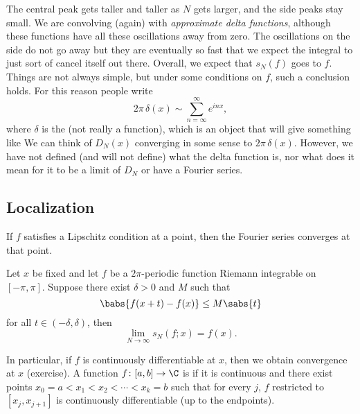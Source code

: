 The central peak gets taller and taller as $N$ gets larger,
and the side peaks stay small.
We are convolving (again) with
\emph{approximate delta functions},
although these functions have
all these oscillations away from zero.  The oscillations on the side do not go away
but they are eventually so fast that we expect the integral to just sort of
cancel itself out there.
Overall, we expect that
$s_N(f)$ goes to $f$.  Things are not always simple,
but under some conditions on $f$, such a conclusion holds.  For this reason
people write
\begin{equation*}
2\pi \, \delta(x) \sim \sum_{n=\infty}^\infty e^{inx} ,
\end{equation*}
where $\delta$ is the  (not really a function),
which is an object that will give something like
We can think of $D_N(x)$ converging in some sense to $2 \pi\, \delta(x)$.
However, we have not defined (and will not define) what the delta function
is, nor what does it mean for it to be a limit of $D_N$ or have a Fourier series.

\subsection{Localization}

If $f$ satisfies a Lipschitz condition at a point, then
the Fourier series converges at that point.

\begin{thm} \label{thm:fourierlocalization}
Let $x$ be fixed and let $f$ be a $2\pi$-periodic function
Riemann integrable on $[-\pi,\pi]$.  Suppose
there exist $\delta > 0$ and $M$ such that
\begin{equation*}
\babs{f(x+t)-f(x)} \leq M \sabs{t}
\end{equation*}
for all $t \in (-\delta,\delta)$, then
\begin{equation*}
\lim_{N \to \infty} s_N(f;x) = f(x) .
\end{equation*}
\end{thm}

In particular,
if $f$ is continuously
differentiable at $x$,
then we obtain convergence at $x$ (exercise).
A function $f \colon [a,b] \to \C$ is
\emph{}
if it is continuous and there exist points
$x_0 = a < x_1 < x_2 < \cdots < x_k = b$
such that for every $j$, $f$ restricted to $[x_j,x_{j+1}]$
is continuously differentiable (up to the endpoints).

